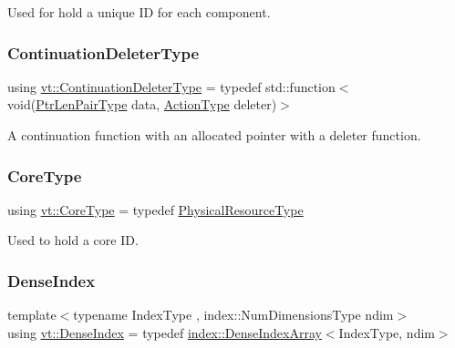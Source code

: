 Used for hold a unique ID for each component. 

\mbox{\label{namespacevt_a6de3bd201e2a040be9362d9d24d1e446}} 
\subsubsection{\texorpdfstring{Continuation\+Deleter\+Type}{ContinuationDeleterType}}
{\footnotesize\ttfamily using \hyperlink{namespacevt_a6de3bd201e2a040be9362d9d24d1e446}{vt\+::\+Continuation\+Deleter\+Type} = typedef std\+::function$<$void(\hyperlink{namespacevt_a97f320a1d3b9b4035e591671cd7d10f0}{Ptr\+Len\+Pair\+Type} data, \hyperlink{namespacevt_ae0a5a7b18cc99d7b732cb4d44f46b0f3}{Action\+Type} deleter)$>$}



A continuation function with an allocated pointer with a deleter function. 

\mbox{\label{namespacevt_a74b11b22c02feaabab8591acc87c7c52}} 
\subsubsection{\texorpdfstring{Core\+Type}{CoreType}}
{\footnotesize\ttfamily using \hyperlink{namespacevt_a74b11b22c02feaabab8591acc87c7c52}{vt\+::\+Core\+Type} = typedef \hyperlink{namespacevt_a2dc36fcada816dc6d11774d650328ee9}{Physical\+Resource\+Type}}



Used to hold a core ID. 

\mbox{\label{namespacevt_ac016d9c31465ce11c14eab2be11f9183}} 
\subsubsection{\texorpdfstring{Dense\+Index}{DenseIndex}}
{\footnotesize\ttfamily template$<$typename Index\+Type , index\+::\+Num\+Dimensions\+Type ndim$>$ \\
using \hyperlink{namespacevt_ac016d9c31465ce11c14eab2be11f9183}{vt\+::\+Dense\+Index} = typedef \hyperlink{structvt_1_1index_1_1_dense_index_array}{index\+::\+Dense\+Index\+Array}$<$Index\+Type, ndim$>$}

